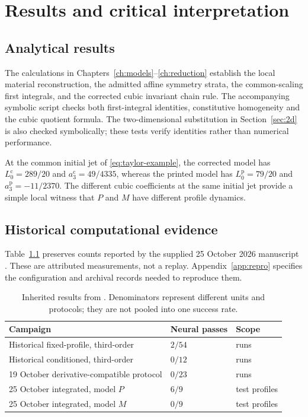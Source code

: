 \documentclass[11pt,a4paper,oneside]{report}
\numberwithin{equation}{chapter}
\begin{document}
\chapter{Results and critical interpretation}\label{ch:results}
\section{Analytical results}
The calculations in Chapters~\ref{ch:models}--\ref{ch:reduction} establish the local material reconstruction, the admitted affine symmetry strata, the common-scaling first integrals, and the corrected cubic invariant chain rule. The accompanying symbolic script checks both first-integral identities, constitutive homogeneity and the cubic quotient formula. The two-dimensional substitution in Section~\ref{sec:2d} is also checked symbolically; these tests verify identities rather than numerical performance.

At the common initial jet of \eqref{eq:taylor-example}, the corrected model has $L_0^{\mathrm c}=289/20$ and $a_3^{\mathrm c}=49/4335$, whereas the printed model has $L_0^{\mathrm p}=79/20$ and $a_3^{\mathrm p}=-11/2370$. The different cubic coefficients at the same initial jet provide a simple local witness that $P$ and $M$ have different profile dynamics.

\section{Historical computational evidence}
Table~\ref{tab:historical} preserves counts reported by the supplied 25 October 2026 manuscript \cite{projectdraft}. These are attributed measurements, not a replay. Appendix~\ref{app:repro} specifies the configuration and archival records needed to reproduce them.

\begin{table}[!htbp]\centering\small
\begin{tabularx}{\textwidth}{@{}Xll@{}}\toprule
Campaign & Neural passes & Scope\\\midrule
Historical fixed-profile, third-order & $2/54$ & runs\\
Historical conditioned, third-order & $0/12$ & runs\\
19 October derivative-compatible protocol & $0/23$ & runs\\
25 October integrated, model $P$ & $6/9$ & test profiles\\
25 October integrated, model $M$ & $0/9$ & test profiles\\\bottomrule
\end{tabularx}
\caption{Inherited results from \cite{projectdraft}. Denominators represent different units and protocols; they are not pooled into one success rate.}\label{tab:historical}
\end{table}
\end{document}

